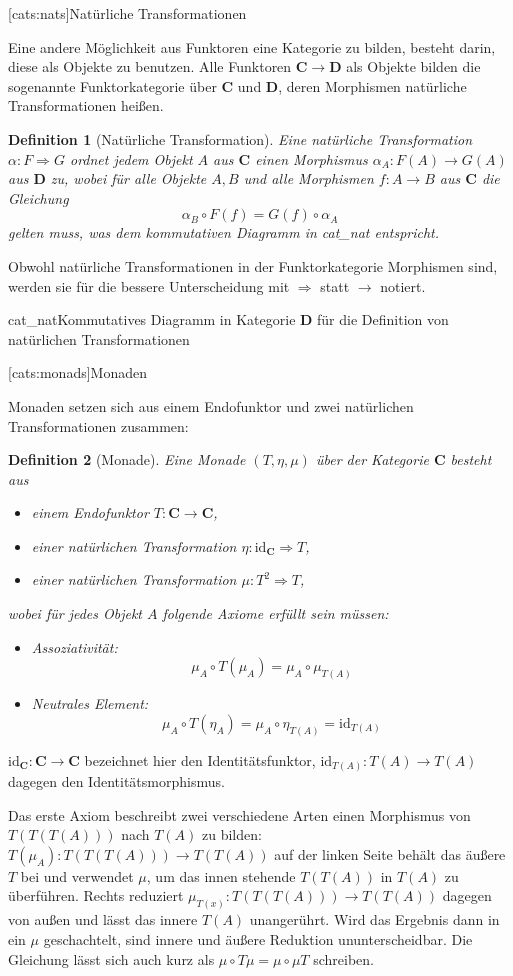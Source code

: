 \documentclass[12pt, a4paper, bibgerm]{scrbook}
\newcommand\lsection{}
\newcommand\abb{}
\newcommand\fig{}
\newcommand\ato{\rightarrow} %
\newcommand\nto{\Rightarrow} %
\newtheorem{defini}{Definition}
\newcommand{\defi}[2]{%
  \begin{defini}[#1]
    \label{def:#1}
    #2
  \end{defini}
}
\begin{document}
\lsection[cats:nats]{Natürliche Transformationen}

Eine andere Möglichkeit aus Funktoren eine Kategorie zu bilden,
besteht darin, diese als Objekte zu benutzen. Alle Funktoren $\mathbf{C}
\ato \mathbf{D}$ als Objekte bilden die sogenannte Funktorkategorie über
$\mathbf{C}$ und $\mathbf{D}$, deren Morphismen natürliche
Transformationen heißen.

\defi{Natürliche Transformation}{Eine natürliche Transformation $\alpha:F \nto
G$ ordnet jedem Objekt $A$ aus $\mathbf{C}$ einen Morphismus
$\alpha_A:F(A) \ato G(A)$ aus $\mathbf{D}$ zu, wobei für alle Objekte
$A,B$ und alle Morphismen $f:A \ato B$ aus $\mathbf{C}$ die
Gleichung
$$\alpha_B \circ F(f) = G(f) \circ \alpha_A $$
gelten muss, was dem kommutativen Diagramm in \abb{cat_nat}
entspricht.
}

Obwohl natürliche Transformationen in der Funktorkategorie Morphismen
sind, werden sie für die bessere Unterscheidung mit $\nto$ statt
$\ato$ notiert.

\fig{cat_nat}{Kommutatives Diagramm in Kategorie $\mathbf{D}$ für die Definition von
  natürlichen Transformationen}

\lsection[cats:monads]{Monaden}

Monaden setzen sich aus einem Endofunktor und zwei natürlichen
Transformationen zusammen:
\defi{Monade}{Eine Monade $(T,\eta,\mu)$ über der Kategorie $\mathbf{C}$ besteht aus
  \begin{itemize}
  \item einem Endofunktor $T:\mathbf{C} \ato \mathbf{C}$,
  \item einer natürlichen Transformation $\eta:\mathrm{id}_{\mathbf{C}} \nto T$,
  \item einer natürlichen Transformation $\mu:T^2 \nto T$,
  \end{itemize}
wobei für jedes Objekt $A$ folgende Axiome erfüllt sein müssen:
\begin{itemize}
\item Assoziativität: $$\mu_A \circ T(\mu_A) = \mu_A \circ \mu_{T(A)}$$
\item Neutrales Element: $$\mu_A \circ T(\eta_A) = \mu_A \circ \eta_{T(A)} = \mathrm{id}_{T(A)}$$
\end{itemize}
} $\mathrm{id}_\mathbf{C}:\mathbf{C} \ato \mathbf{C}$ bezeichnet hier
den Identitätsfunktor, $\mathrm{id}_{T(A)}:T(A) \ato T(A)$ dagegen den
Identitätsmorphismus. 

Das erste Axiom beschreibt zwei verschiedene Arten einen Morphismus von
$T(T(T(A)))$ nach $T(A)$ zu bilden: $T(\mu_A):T(T(T(A))) \ato T(T(A))$
auf der linken Seite behält das äußere $T$ bei und verwendet $\mu$, um
das innen stehende $T(T(A))$ in $T(A)$ zu überführen. Rechts reduziert
$\mu_{T(x)}:T(T(T(A))) \ato T(T(A))$ dagegen von außen und lässt das
innere $T(A)$ unangerührt. Wird das Ergebnis dann in ein $\mu$
geschachtelt, sind innere und äußere Reduktion ununterscheidbar. Die
Gleichung lässt sich auch kurz als $\mu \circ T \mu = \mu \circ \mu T$
schreiben.
\end{document}
